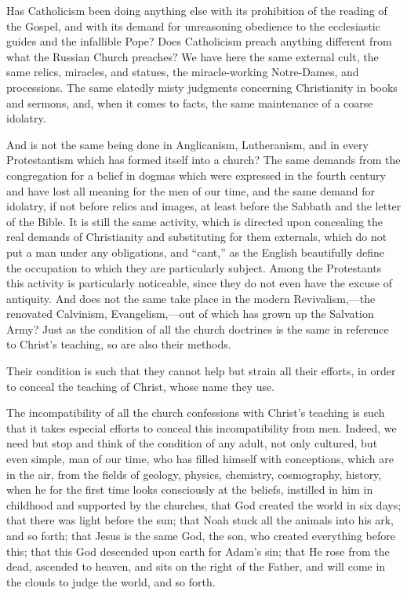 \documentclass{book}
\begin{document}
Has Catholicism been doing anything else with its prohibition of the reading of the Gospel, and with its demand for unreasoning obedience to the ecclesiastic guides and the infallible Pope? Does Catholicism preach anything different from what the Russian Church preaches? We have here the same external cult, the same relics, miracles, and statues, the miracle-working Notre-Dames, and processions. The same elatedly misty judgments concerning Christianity in books and sermons, and, when it comes to facts, the same maintenance of a coarse idolatry.

And is not the same being done in Anglicanism, Lutheranism, and in every Protestantism which has formed itself into a church? The same demands from the congregation for a belief in dogmas which were expressed in the fourth century and have lost all meaning for the men of our time, and the same demand for idolatry, if not before relics and images, at least before the Sabbath and the letter of the Bible. It is still the same activity, which is directed upon concealing the real demands of Christianity and substituting for them externals, which do not put a man under any obligations, and “cant,” as the English beautifully define the occupation to which they are particularly subject. Among the Protestants this activity is particularly noticeable, since they do not even have the excuse of antiquity. And does not the same take place in the modern Revivalism,—the renovated Calvinism, Evangelism,—out of which has grown up the Salvation Army? Just as the condition of all the church doctrines is the same in reference to Christ’s teaching, so are also their methods.

Their condition is such that they cannot help but strain all their efforts, in order to conceal the teaching of Christ, whose name they use.

The incompatibility of all the church confessions with Christ’s teaching is such that it takes especial efforts to conceal this incompatibility from men. Indeed, we need but stop and think of the condition of any adult, not only cultured, but even simple, man of our time, who has filled himself with conceptions, which are in the air, from the fields of geology, physics, chemistry, cosmography, history, when he for the first time looks consciously at the beliefs, instilled in him in childhood and supported by the churches, that God created the world in six days; that there was light before the sun; that Noah stuck all the animals into his ark, and so forth; that Jesus is the same God, the son, who created everything before this; that this God descended upon earth for Adam’s sin; that He rose from the dead, ascended to heaven, and sits on the right of the Father, and will come in the clouds to judge the world, and so forth.
\end{document}
